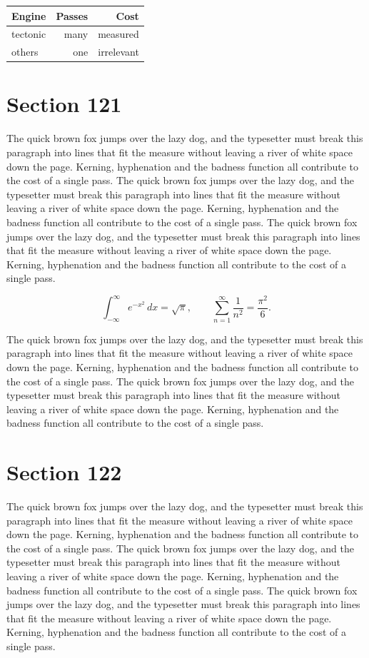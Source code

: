 \documentclass{article}
\begin{document}
\begin{center}
\begin{tabular}{lrr}
\toprule
Engine & Passes & Cost \\
\midrule
tectonic & many & measured \\
others & one & irrelevant \\
\bottomrule
\end{tabular}
\end{center}

\section{Section 121}
The quick brown fox jumps over the lazy dog, and the typesetter must break this paragraph into lines that fit the measure without leaving a river of white space down the page. Kerning, hyphenation and the badness function all contribute to the cost of a single pass. The quick brown fox jumps over the lazy dog, and the typesetter must break this paragraph into lines that fit the measure without leaving a river of white space down the page. Kerning, hyphenation and the badness function all contribute to the cost of a single pass. The quick brown fox jumps over the lazy dog, and the typesetter must break this paragraph into lines that fit the measure without leaving a river of white space down the page. Kerning, hyphenation and the badness function all contribute to the cost of a single pass. 

\begin{equation}
\int_{-\infty}^{\infty} e^{-x^{2}}\,dx = \sqrt{\pi}, \qquad
\sum_{n=1}^{\infty} \frac{1}{n^{2}} = \frac{\pi^{2}}{6}.
\end{equation}

The quick brown fox jumps over the lazy dog, and the typesetter must break this paragraph into lines that fit the measure without leaving a river of white space down the page. Kerning, hyphenation and the badness function all contribute to the cost of a single pass. The quick brown fox jumps over the lazy dog, and the typesetter must break this paragraph into lines that fit the measure without leaving a river of white space down the page. Kerning, hyphenation and the badness function all contribute to the cost of a single pass. 
\section{Section 122}
The quick brown fox jumps over the lazy dog, and the typesetter must break this paragraph into lines that fit the measure without leaving a river of white space down the page. Kerning, hyphenation and the badness function all contribute to the cost of a single pass. The quick brown fox jumps over the lazy dog, and the typesetter must break this paragraph into lines that fit the measure without leaving a river of white space down the page. Kerning, hyphenation and the badness function all contribute to the cost of a single pass. The quick brown fox jumps over the lazy dog, and the typesetter must break this paragraph into lines that fit the measure without leaving a river of white space down the page. Kerning, hyphenation and the badness function all contribute to the cost of a single pass. 
\end{document}

